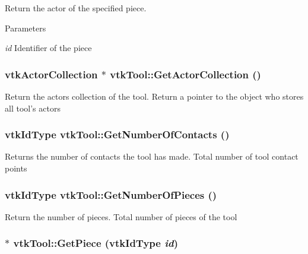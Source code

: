 Return the actor of the specified piece. 
\begin{DoxyParams}{Parameters}
\item[{\em id}]Identifier of the piece \end{DoxyParams}
\hypertarget{classvtkTool_a395a049fb5376df57590b96fc64d8092}{
\subsubsection[{GetActorCollection}]{\setlength{\rightskip}{0pt plus 5cm}vtkActorCollection $\ast$ vtkTool::GetActorCollection ()}}
\label{classvtkTool_a395a049fb5376df57590b96fc64d8092}


Return the actors collection of the tool. Return a pointer to the object who stores all tool's actors \hypertarget{classvtkTool_a30d28cc8f7799ffac0527482c848f92a}{
\subsubsection[{GetNumberOfContacts}]{\setlength{\rightskip}{0pt plus 5cm}vtkIdType vtkTool::GetNumberOfContacts ()}}
\label{classvtkTool_a30d28cc8f7799ffac0527482c848f92a}


Returns the number of contacts the tool has made. Total number of tool contact points \hypertarget{classvtkTool_a22808ab908533188843b2970424d8310}{
\subsubsection[{GetNumberOfPieces}]{\setlength{\rightskip}{0pt plus 5cm}vtkIdType vtkTool::GetNumberOfPieces ()}}
\label{classvtkTool_a22808ab908533188843b2970424d8310}


Return the number of pieces. Total number of pieces of the tool \hypertarget{classvtkTool_a4316c5cd3281c663da03f6854c350788}{
\subsubsection[{GetPiece}]{ $\ast$ vtkTool::GetPiece (vtkIdType {\em id})}}
\label{classvtkTool_a4316c5cd3281c663da03f6854c350788}


